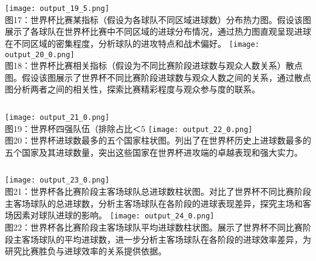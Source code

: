 \documentclass{beamer}
\begin{document}
	\begin{frame}
		\begin{columns}
			\centering
			\texttt{[image: output\_19\_5.png]} \\
			\small 图17：世界杯比赛某指标（假设为各球队不同区域进球数）分布热力图。假设该图展示了各球队在世界杯比赛中不同区域的进球分布情况，通过热力图直观呈现进球在不同区域的密集程度，分析球队的进攻特点和战术偏好。
			\centering
			\texttt{[image: output\_20\_0.png]} \\
			\small 图18：世界杯比赛相关指标（假设为不同比赛阶段进球数与观众人数关系）散点图。假设该图展示了世界杯不同比赛阶段进球数与观众人数之间的关系，通过散点图分析两者之间的相关性，探索比赛精彩程度与观众参与度的联系。
		\end{columns}
	\end{frame}
	
	\begin{frame}
		\begin{columns}
			\column{0.5\textwidth}
			\centering
			\texttt{[image: output\_21\_0.png]} \\
			\small 图19：世界杯四强队伍（排除占比＜5%
			\column{0.5\textwidth}
			\centering
			\texttt{[image: output\_22\_0.png]} \\
			\small 图20：世界杯进球数最多的五个国家柱状图。列出了在世界杯历史上进球数最多的五个国家及其进球数量，突出这些国家在世界杯进攻端的卓越表现和强大实力。
		\end{columns}
	\end{frame}
	
	\begin{frame}
		\begin{columns}
			\column{0.5\textwidth}
			\centering
			\texttt{[image: output\_23\_0.png]} \\
			\small 图21：世界杯各比赛阶段主客场球队总进球数柱状图。对比了世界杯不同比赛阶段主客场球队的总进球数，分析主客场球队在各阶段的进球表现差异，探究主场和客场因素对球队进球的影响。
			\column{0.5\textwidth}
			\centering
			\texttt{[image: output\_24\_0.png]} \\
			\small 图22：世界杯各比赛阶段主客场球队平均进球数柱状图。展示了世界杯不同比赛阶段主客场球队的平均进球数，进一步分析主客场球队在各阶段的进球效率差异，为研究比赛胜负与进球效率的关系提供依据。
		\end{columns}
	\end{frame}
	
\end{document}

